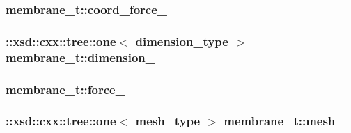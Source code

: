 \subsubsection[{\texorpdfstring{coord\+\_\+force\+\_\+}{coord_force_}}]{ membrane\+\_\+t\+::coord\+\_\+force\+\_\+\hspace{0.3cm}{\ttfamily [protected]}}\hypertarget{classmembrane__t_a4452b21f0eec366b16aeb3ffd5ef49a8}{}\label{classmembrane__t_a4452b21f0eec366b16aeb3ffd5ef49a8}
\subsubsection[{\texorpdfstring{dimension\+\_\+}{dimension_}}]{\setlength{\rightskip}{0pt plus 5cm}\+::xsd\+::cxx\+::tree\+::one$<$ {\bf dimension\+\_\+type} $>$ membrane\+\_\+t\+::dimension\+\_\+\hspace{0.3cm}{\ttfamily [protected]}}\hypertarget{classmembrane__t_aa5fb7d3fefa37bd360d24cc7849bfea1}{}\label{classmembrane__t_aa5fb7d3fefa37bd360d24cc7849bfea1}
\subsubsection[{\texorpdfstring{force\+\_\+}{force_}}]{ membrane\+\_\+t\+::force\+\_\+\hspace{0.3cm}{\ttfamily [protected]}}\hypertarget{classmembrane__t_a40f545e373f2c8625b14f77b1485221d}{}\label{classmembrane__t_a40f545e373f2c8625b14f77b1485221d}
\subsubsection[{\texorpdfstring{mesh\+\_\+}{mesh_}}]{\setlength{\rightskip}{0pt plus 5cm}\+::xsd\+::cxx\+::tree\+::one$<$ {\bf mesh\+\_\+type} $>$ membrane\+\_\+t\+::mesh\+\_\+\hspace{0.3cm}{\ttfamily [protected]}}\hypertarget{classmembrane__t_ae5676c4d93bd425bebd47c9649defe45}{}\label{classmembrane__t_ae5676c4d93bd425bebd47c9649defe45}
